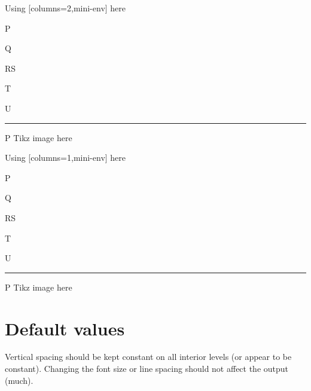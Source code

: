 \documentclass[10pt]{article}
\begin{document}
\begin{enumext}[list-indent=3cm,listparindent=-1cm,list-offset=3cm,partopsep=0pt,itemsep=0pt,columns=1]
\item Using [columns=2,mini-env] here

  \begin{enumext}[columns=2,mini-env=0.4\linewidth]%
    \item  P \item Q \item RS \item T \item U
    \miniright
    \rule{30pt}{20pt}\par
    P Tikz image here
  \end{enumext}

\item Using [columns=1,mini-env] here

  \begin{enumext}[columns=1,mini-env=0.4\linewidth]%
    \item  P \item Q \item RS \item T \item U
    \miniright
    \rule{30pt}{20pt}\par
    P Tikz image here
  \end{enumext}

\end{enumext}


\section{Default values}

Vertical spacing should be kept constant on all interior levels (or
appear to be constant). Changing the font size or line spacing should
not affect the output (much).
\end{document}

